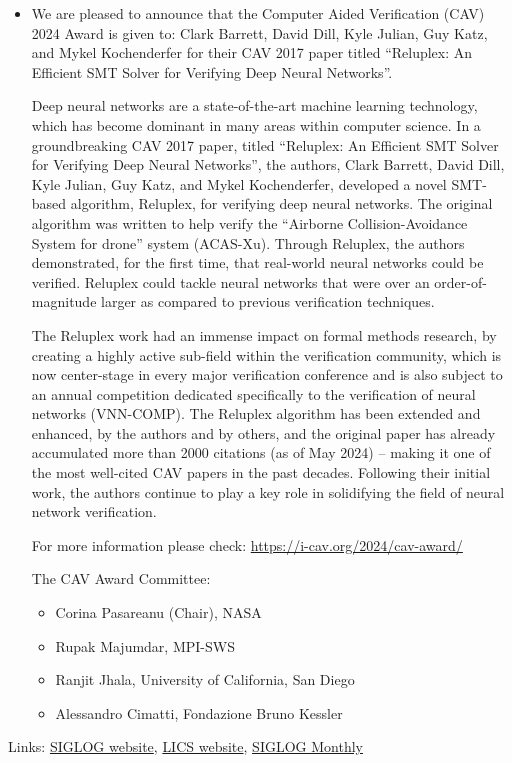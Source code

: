 \documentclass[prodmode,acmtecs]{acmsmall} %
\begin{document}
\begin{itemize}\item  We are pleased to announce that the Computer Aided Verification (CAV) 2024 Award is given to: Clark Barrett, David Dill, Kyle Julian, Guy Katz, and Mykel Kochenderfer for their CAV 2017 paper titled “Reluplex: An Efficient SMT Solver for Verifying Deep Neural Networks”.  
 
  Deep neural networks are a state-of-the-art machine learning technology, which has become dominant in many areas within computer science. In a groundbreaking CAV 2017 paper, titled “Reluplex: An Efficient SMT Solver for Verifying Deep Neural Networks”, the authors, Clark Barrett, David Dill, Kyle Julian, Guy Katz, and Mykel Kochenderfer, developed a novel SMT-based algorithm, Reluplex, for verifying deep neural networks. The original algorithm was written to help verify the “Airborne Collision-Avoidance System for drone” system (ACAS-Xu).  Through Reluplex, the authors demonstrated, for the first time, that real-world neural networks could be verified. Reluplex could tackle neural networks that were over an order-of-magnitude larger as compared to previous verification techniques.  
 
  The Reluplex work had an immense impact on formal methods research, by creating a  highly active sub-field within the verification community, which is now center-stage in every major verification conference and is also subject to an annual competition dedicated specifically to the verification of neural networks (VNN-COMP). The Reluplex algorithm has been extended and enhanced, by the authors and by others, and the original paper has already accumulated more than 2000 citations (as of May 2024) – making it one of the most well-cited CAV papers in the past decades. Following their initial work, the authors continue to play a key role in solidifying the field of neural network verification. 
 
  For more information please check: \href{https://i-cav.org/2024/cav-award/}{https://i-cav.org/2024/cav-award/} 
 
  The CAV Award Committee: 
 
\begin{itemize}\item  Corina Pasareanu (Chair), NASA
\item  Rupak Majumdar, MPI-SWS
\item  Ranjit Jhala, University of California, San Diego
\item  Alessandro Cimatti, Fondazione Bruno Kessler
\end{itemize} 
\end{itemize}


\bigskip Links: \href{http://siglog.org/}{SIGLOG website}, \href{https://lics.siglog.org}{LICS website}, \href{https://lics.siglog.org/newsletters/}{SIGLOG Monthly}
\end{document}
